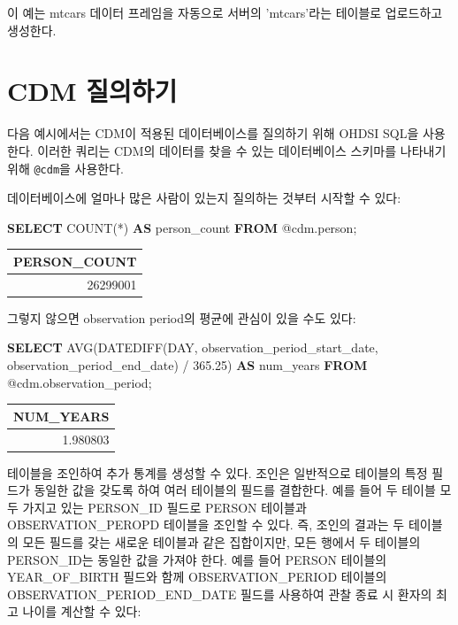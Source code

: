 \documentclass[10.5pt]{book}
\newenvironment{Shaded}{\begin{snugshade}}{\end{snugshade}}
\newcommand{\KeywordTok}[1]{\textcolor[rgb]{0.13,0.29,0.53}{\textbf{#1}}}
\newcommand{\DataTypeTok}[1]{\textcolor[rgb]{0.13,0.29,0.53}{#1}}
\newcommand{\FloatTok}[1]{\textcolor[rgb]{0.00,0.00,0.81}{#1}}
\newcommand{\FunctionTok}[1]{\textcolor[rgb]{0.00,0.00,0.00}{#1}}
\newcommand{\NormalTok}[1]{#1}
\theoremstyle{definition}
\theoremstyle{definition}
\theoremstyle{definition}
\theoremstyle{remark}
\begin{document}
이 예는 mtcars 데이터 프레임을 자동으로 서버의 'mtcars'라는 테이블로
업로드하고 생성한다.

\section{CDM 질의하기}\label{QueryTheCdm}

다음 예시에서는 CDM이 적용된 데이터베이스를 질의하기 위해 OHDSI SQL을
사용한다. 이러한 쿼리는 CDM의 데이터를 찾을 수 있는 데이터베이스
스키마를 나타내기 위해 \texttt{@cdm}을 사용한다.

데이터베이스에 얼마나 많은 사람이 있는지 질의하는 것부터 시작할 수 있다:

\begin{Shaded}
\begin{Highlighting}[]
\KeywordTok{SELECT} \FunctionTok{COUNT}\NormalTok{(*) }\KeywordTok{AS}\NormalTok{ person_count }\KeywordTok{FROM}\NormalTok{ @cdm.person;}
\end{Highlighting}
\end{Shaded}

\begin{longtable}[]{@{}r@{}}
\toprule
PERSON\_COUNT\tabularnewline
\midrule
\endhead
26299001\tabularnewline
\bottomrule
\end{longtable}

그렇지 않으면 observation period의 평균에 관심이 있을 수도 있다:

\begin{Shaded}
\begin{Highlighting}[]
\KeywordTok{SELECT} \FunctionTok{AVG}\NormalTok{(DATEDIFF(}\DataTypeTok{DAY}\NormalTok{, }
\NormalTok{                    observation_period_start_date, }
\NormalTok{                    observation_period_end_date) / }\FloatTok{365.25}\NormalTok{) }\KeywordTok{AS}\NormalTok{ num_years}
\KeywordTok{FROM}\NormalTok{ @cdm.observation_period;}
\end{Highlighting}
\end{Shaded}

\begin{longtable}[]{@{}r@{}}
\toprule
NUM\_YEARS\tabularnewline
\midrule
\endhead
1.980803\tabularnewline
\bottomrule
\end{longtable}

테이블을 조인하여 추가 통계를 생성할 수 있다. 조인은 일반적으로 테이블의
특정 필드가 동일한 값을 갖도록 하여 여러 테이블의 필드를 결합한다. 예를
들어 두 테이블 모두 가지고 있는 PERSON\_ID 필드로 PERSON 테이블과
OBSERVATION\_PEROPD 테이블을 조인할 수 있다. 즉, 조인의 결과는 두
테이블의 모든 필드를 갖는 새로운 테이블과 같은 집합이지만, 모든 행에서
두 테이블의 PERSON\_ID는 동일한 값을 가져야 한다. 예를 들어 PERSON
테이블의 YEAR\_OF\_BIRTH 필드와 함께 OBSERVATION\_PERIOD 테이블의
OBSERVATION\_PERIOD\_END\_DATE 필드를 사용하여 관찰 종료 시 환자의 최고
나이를 계산할 수 있다:
\end{document}
